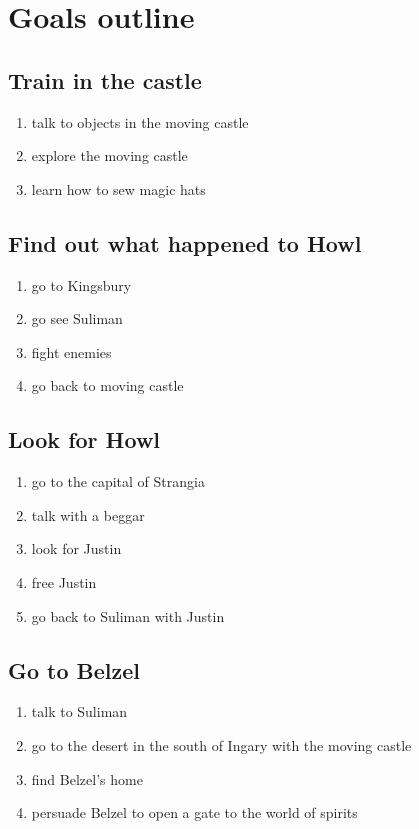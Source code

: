 \chapter{Goals outline}

\section{Train in the castle}
\begin{enumerate}
\item talk to objects in the moving castle
\item explore the moving castle
\item learn how to sew magic hats
\end{enumerate}

\section{Find out what happened to Howl}
\begin{enumerate}
\item go to Kingsbury
\item go see Suliman
\item fight enemies
\item go back to moving castle
\end{enumerate}

\section{Look for Howl}
\begin{enumerate}
\item go to the capital of Strangia
\item talk with a beggar
\item look for Justin
\item free Justin
\item go back to Suliman with Justin
\end{enumerate}

\section{Go to Belzel}
\begin{enumerate}
\item talk to Suliman
\item go to the desert in the south of Ingary with the moving castle
\item find Belzel’s home
\item persuade Belzel to open a gate to the world of spirits
\end{enumerate}

